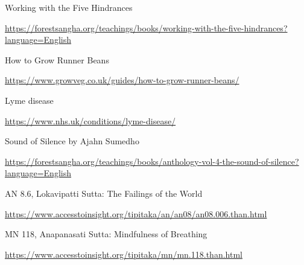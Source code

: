 \begin{thebibliography}{9}
 Working with the Five Hindrances

  {\urlsize \url{https://forestsangha.org/teachings/books/working-with-the-five-hindrances?language=English}}

 How to Grow Runner Beans

  {\urlsize \url{https://www.growveg.co.uk/guides/how-to-grow-runner-beans/}}

 Lyme disease

  {\urlsize \url{https://www.nhs.uk/conditions/lyme-disease/}}

 Sound of Silence by Ajahn Sumedho

  {\urlsize \url{https://forestsangha.org/teachings/books/anthology-vol-4-the-sound-of-silence?language=English}}

 AN 8.6, Lokavipatti Sutta: The Failings of the World

  {\urlsize \url{https://www.accesstoinsight.org/tipitaka/an/an08/an08.006.than.html}}

 MN 118, Anapanasati Sutta: Mindfulness of Breathing

  {\urlsize \url{https://www.accesstoinsight.org/tipitaka/mn/mn.118.than.html}}

\end{thebibliography}
